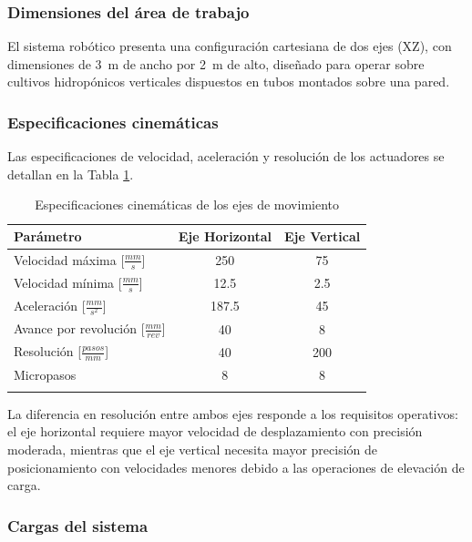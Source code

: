 \subsubsection{Dimensiones del área de trabajo}

El sistema robótico presenta una configuración cartesiana de dos ejes (XZ), con dimensiones de 3~m de ancho por 2~m de alto, diseñado para operar sobre cultivos hidropónicos verticales dispuestos en tubos montados sobre una pared.

\subsubsection{Especificaciones cinemáticas}

Las especificaciones de velocidad, aceleración y resolución de los actuadores se detallan en la Tabla \ref{tab:esp_cinematicas}.

\begin{table}[htbp]
\centering
\begin{tabular}{|l|c|c|}
\hline
\textbf{Parámetro} & \textbf{Eje Horizontal} & \textbf{Eje Vertical} \\ \hline
Velocidad máxima [\(\frac{mm}{s}\)] & 250 & 75 \\ \hline
Velocidad mínima [\(\frac{mm}{s}\)] & 12.5 & 2.5 \\ \hline
Aceleración [\(\frac{mm}{s^2}\)] & 187.5 & 45 \\ \hline
Avance por revolución [\(\frac{mm}{rev}\)] & 40 & 8 \\ \hline
Resolución [\(\frac{pasos}{mm}\)] & 40 & 200 \\ \hline
Micropasos & 8 & 8 \\ \hline
\multicolumn{3}{c}{} \\
\end{tabular}
\caption{Especificaciones cinemáticas de los ejes de movimiento}
\label{tab:esp_cinematicas}
\end{table}

La diferencia en resolución entre ambos ejes responde a los requisitos operativos: el eje horizontal requiere mayor velocidad de desplazamiento con precisión moderada, mientras que el eje vertical necesita mayor precisión de posicionamiento con velocidades menores debido a las operaciones de elevación de carga.

\subsubsection{Cargas del sistema}

